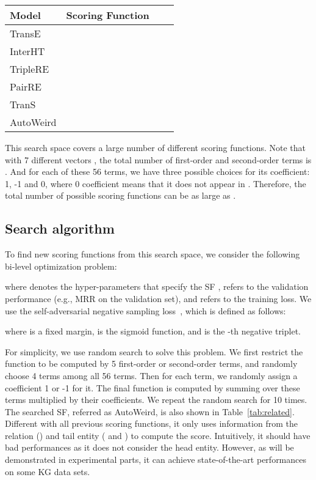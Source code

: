 \documentclass{article}
\begin{document}
\begin{table*}[!ht]
\small
\caption{Example knowledge graph embedding models that can be covered by our search space.}
\label{tab:related}
\centering
\begin{tabular}{l l l l }
	\toprule
	Model &  Scoring Function \\
	\midrule
	TransE~\cite{bordes2013translating} &  \\
	InterHT~\cite{wang2022interht} &  \\
	TripleRE~\cite{long2021triplere} &  \\
	PairRE~\cite{chao2020pairre} &  \\
	TranS~\cite{zhang2022trans} &  \\
	\midrule \midrule
	AutoWeird &  \\
	\bottomrule 
\end{tabular}
\end{table*}

This search space covers a large number of different scoring functions. 
Note that with 7 different vectors , 
the total number of first-order and second-order terms is . 
And for each of these 56 terms, we have three possible choices for its coefficient: 1, -1 and 0, 
where 0 coefficient means that it does not appear in . 
Therefore, the total number of possible scoring functions can be as large as .



\subsection{Search algorithm}
\label{ssec:alg}

To find new scoring functions from this search space, we consider the following bi-level optimization problem: 

where  denotes the hyper-parameters that specify the SF , 
 refers to the validation performance (e.g., MRR on the validation set), 
and  refers to the training loss. 
We use the self-adversarial negative sampling loss~\cite{sun2019rotate}, 
which is defined as follows:  

where  is a fixed margin,  is the sigmoid function, and  is the -th negative triplet.

For simplicity, we use random search to solve this problem. 
We first restrict the  function to be computed by 5 first-order or second-order terms, 
and randomly choose 4 terms among all 56 terms. 
Then for each term, we randomly assign a coefficient 1 or -1 for it.
The final function  is computed by summing over these terms multiplied by their coefficients. 
We repeat the random search for 10 times. 
The searched SF, referred as AutoWeird, is also shown in Table~\ref{tab:related}.
Different with all previous scoring functions, it only uses information from the relation ()
 and tail entity (  and ) 
 to compute the score. 
Intuitively, it should have bad performances as it does not consider the head entity. 
However, as will be demonstrated in experimental parts, 
it can achieve state-of-the-art performances on some KG data sets. 
\end{document}
